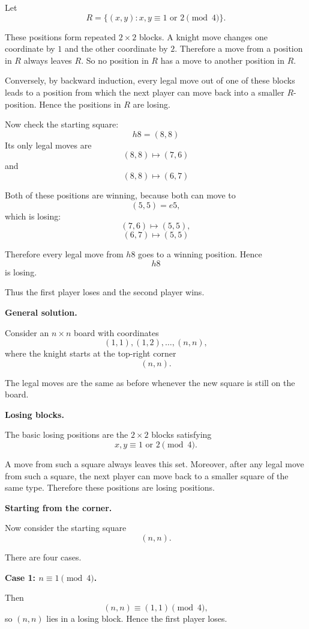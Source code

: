 Let
\[
R=\{(x,y): x,y\equiv 1 \text{ or }2 \pmod 4\}.
\]

These positions form repeated \(2\times2\) blocks. A knight move changes one
coordinate by \(1\) and the other coordinate by \(2\). Therefore a move from a
position in \(R\) always leaves \(R\). So no position in \(R\) has a move to
another position in \(R\).

Conversely, by backward induction, every legal move out of one of these blocks
leads to a position from which the next player can move back into a smaller
\(R\)-position. Hence the positions in \(R\) are losing.

Now check the starting square:
\[
h8=(8,8)
\]
Its only legal moves are
\[
(8,8)\mapsto (7,6)
\]
and
\[
(8,8)\mapsto (6,7)
\]

Both of these positions are winning, because both can move to
\[
(5,5)=e5,
\]
which is losing:
\[
(7,6)\mapsto (5,5),
\]
\[
(6,7)\mapsto (5,5)
\]

Therefore every legal move from \(h8\) goes to a winning position. Hence
\[
h8
\]
is losing.

Thus the first player loses and the second player wins.

\medskip
\noindent\textbf{General solution.}

Consider an \(n\times n\) board with coordinates
\[
(1,1), (1,2), \ldots, (n,n),
\]
where the knight starts at the top-right corner
\[
(n,n).
\]

The legal moves are the same as before whenever the new square is still on the board.


\medskip
\noindent\textbf{Losing blocks.}

The basic losing positions are the \(2\times2\) blocks satisfying
\[
x,y\equiv 1 \text{ or } 2 \pmod 4.
\]


A move from such a square always leaves this set. Moreover, after any legal move from such a square, the next player can move back to a smaller square of the same type. Therefore these positions are losing positions.

\medskip
\noindent\textbf{Starting from the corner.}

Now consider the starting square
\[
(n,n).
\]

There are four cases.

\medskip
\noindent\textbf{Case 1: \(n\equiv1\pmod4\).}

Then
\[
(n,n)\equiv(1,1)\pmod4,
\]
so \((n,n)\) lies in a losing block. Hence the first player loses.

